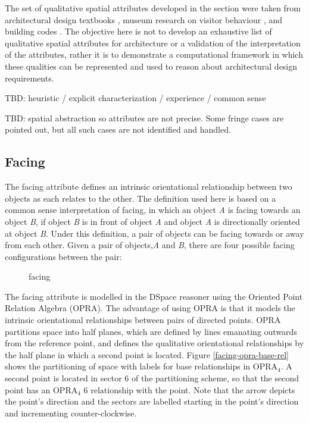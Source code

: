 \documentclass[12pt]{ucthesis}
\begin{document}
The set of qualitative spatial attributes developed in the section were taken from architectural design textbooks \cite{TBD}, museum research on visitor behaviour \cite{TBD}, and building codes \cite{TBD}. The objective here is not to develop an exhaustive list of qualitative spatial attributes for architecture or a validation of the interpretation of the attributes, rather it is to demonstrate a computational framework in which these qualities can be represented and used to reason about architectural design requirements.

TBD: heuristic / explicit characterization / experience / common sense

TBD: spatial abstraction so attributes are not precise. Some fringe cases are pointed out, but all such cases are not identified and handled.

\subsection{Facing}
The facing attribute defines an intrinsic orientational relationship between two objects as each relates to the other. The definition used here is based on a common sense interpretation of facing, in which an object \emph{A} is facing towards an object \emph{B}, if object \emph{B} is in front of object \emph{A} and object \emph{A} is directionally oriented at object \emph{B}. Under this definition, a pair of objects can be facing towards or away from each other. Given a pair of objects,\emph{A} and \emph{B}, there are four possible facing configurations between the pair: 

\begin{figure}[H]
 \centering
 \hspace{10 mm}
  \hspace{10 mm}
 \hspace{10 mm}
 \caption{facing}
\label{display-arrangement}
\end{figure}

The facing attribute is modelled in the DSpace reasoner using the Oriented Point Relation Algebra \cite{Moratz} (OPRA). The advantage of using OPRA is that it models the intrinsic orientational relationships between pairs of directed points. OPRA partitions space into half planes, which are defined by lines emanating outwards from the reference point, and defines the qualitative orientational relationships by the half plane in which a second point is located. Figure \ref{facing-opra-base-rel} shows the partitioning of space with labels for base relationships in OPRA$_{4}$. A second point is located in sector 6 of the partitioning scheme, so that the second point has an OPRA$_{4}$ 6 relationship with the point. Note that the arrow depicts the point's direction and the sectors are labelled starting in the point's direction and incrementing counter-clockwise. 
\end{document}
